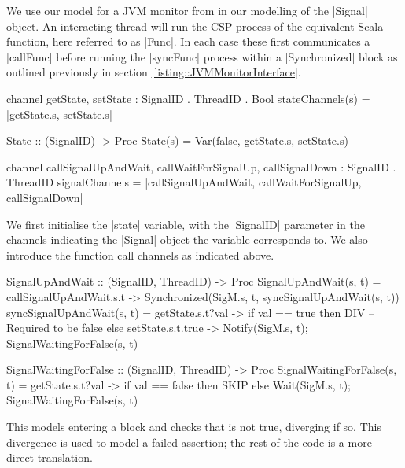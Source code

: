 We use our model for a JVM monitor from  in our modelling of the |Signal| object. 
 An interacting thread will run the CSP process of the equivalent Scala function, here referred to as |Func|. In each case these first communicates a |callFunc| before running the |syncFunc| process within a |Synchronized| block as outlined previously in section  \ref{listing::JVMMonitorInterface}.

 \begin{cspm}[caption={The state variable(s) and the function call channels}]
channel getState, setState : SignalID . ThreadID . Bool
stateChannels(s) = {|getState.s, setState.s|}

State :: (SignalID) -> Proc
State(s) = Var(false, getState.s, setState.s)

channel callSignalUpAndWait, callWaitForSignalUp, callSignalDown : SignalID . ThreadID
signalChannels = {|callSignalUpAndWait, callWaitForSignalUp, callSignalDown|}
 \end{cspm}

 We first initialise the |state| variable, with the |SignalID| parameter in the channels indicating the |Signal| object the variable corresponds to. We also introduce the function call channels as indicated above.

\begin{cspm}[caption={The CSP model of the {\scalastyle signalUpAndWait} function of the {\scalastyle Signal} object}]
SignalUpAndWait :: (SignalID, ThreadID) -> Proc
SignalUpAndWait(s, t) = 
  callSignalUpAndWait.s.t -> Synchronized(SigM.s, t, syncSignalUpAndWait(s, t))
syncSignalUpAndWait(s, t) = 
  getState.s.t?val -> if val == true then DIV -- Required to be false
                      else setState.s.t.true -> 
                          Notify(SigM.s, t); SignalWaitingForFalse(s, t)


SignalWaitingForFalse :: (SignalID, ThreadID) -> Proc
SignalWaitingForFalse(s, t) = 
  getState.s.t?val -> if val == false then SKIP
                      else Wait(SigM.s, t); SignalWaitingForFalse(s, t)                            
\end{cspm}

This models entering a \inlineScala {} block and checks that  is not true, diverging if so. This divergence is used to model a failed assertion; the rest of the code is a more direct translation.

